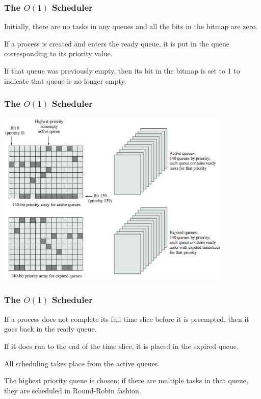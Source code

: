 \begin{frame}
\frametitle{The $O(1)$ Scheduler}

Initially, there are no tasks in any queues and all the bits in the bitmap are zero. 

If a process is created and enters the ready queue, it is put in the queue corresponding to its priority value. 

If that queue was previously empty, then its bit in the bitmap is set to 1 to indicate that queue is no longer empty.


\end{frame}

\begin{frame}
\frametitle{The $O(1)$ Scheduler}


\begin{center}
	\includegraphics[width=0.85\textwidth]{images/linux-o1-struct.png}
\end{center}

\end{frame}

\begin{frame}
\frametitle{The $O(1)$ Scheduler}

If a process does not complete its full time slice before it is preempted, then it goes back in the ready queue. 

If it does run to the end of the time slice, it is placed in the expired queue. 

All scheduling takes place from the active queues. 

The highest priority queue is chosen; if there are multiple tasks in that queue, they are scheduled in Round-Robin fashion. 

\end{frame}

